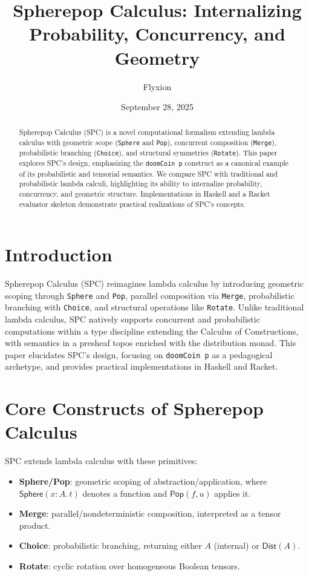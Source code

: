 \documentclass{article}
\title{Spherepop Calculus: Internalizing Probability, Concurrency, and Geometry}
\author{Flyxion}
\date{September 28, 2025}
\newcommand{\Sphere}{\mathsf{Sphere}}
\newcommand{\Pop}{\mathsf{Pop}}
\newcommand{\Dist}{\mathsf{Dist}}
\begin{document}
\maketitle

\begin{abstract}
Spherepop Calculus (SPC) is a novel computational formalism extending lambda calculus with geometric scope (\texttt{Sphere} and \texttt{Pop}), concurrent composition (\texttt{Merge}), probabilistic branching (\texttt{Choice}), and structural symmetries (\texttt{Rotate}). This paper explores SPC’s design, emphasizing the \texttt{doomCoin p} construct as a canonical example of its probabilistic and tensorial semantics. We compare SPC with traditional and probabilistic lambda calculi, highlighting its ability to internalize probability, concurrency, and geometric structure. Implementations in Haskell and a Racket evaluator skeleton demonstrate practical realizations of SPC’s concepts.
\end{abstract}

\section{Introduction}
Spherepop Calculus (SPC) reimagines lambda calculus by introducing geometric scoping through \texttt{Sphere} and \texttt{Pop}, parallel composition via \texttt{Merge}, probabilistic branching with \texttt{Choice}, and structural operations like \texttt{Rotate}. Unlike traditional lambda calculus, SPC natively supports concurrent and probabilistic computations within a type discipline extending the Calculus of Constructions, with semantics in a presheaf topos enriched with the distribution monad. This paper elucidates SPC’s design, focusing on \texttt{doomCoin p} as a pedagogical archetype, and provides practical implementations in Haskell and Racket.

\section{Core Constructs of Spherepop Calculus}
SPC extends lambda calculus with these primitives:

\begin{itemize}
  \item \textbf{Sphere/Pop}: geometric scoping of abstraction/application, where \(\Sphere(x{:}A.\,t)\) denotes a function and \(\Pop(f,u)\) applies it.
  \item \textbf{Merge}: parallel/nondeterministic composition, interpreted as a tensor product.
  \item \textbf{Choice}: probabilistic branching, returning either \(A\) (internal) or \(\Dist(A)\).
  \item \textbf{Rotate}: cyclic rotation over homogeneous Boolean tensors.
\end{itemize}
\end{document}
